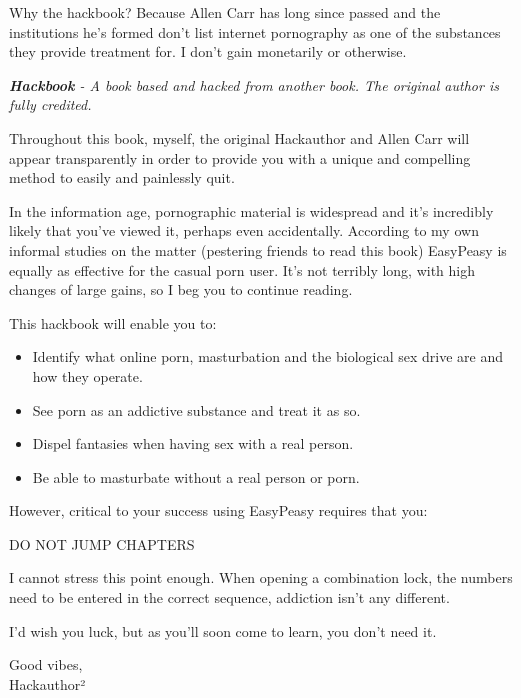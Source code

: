 \documentclass[easypeasy.tex]{subfiles}
\begin{document}
Why the hackbook? Because Allen Carr has long since passed and the institutions he's formed don't list internet pornography as one of the substances they provide treatment for. I don't gain monetarily or otherwise.

\textit{{\small \textbf{Hackbook} - A book based and hacked from another book. The original author is fully credited.}}

Throughout this book, myself, the original Hackauthor and Allen Carr will appear transparently in order to provide you with a unique and compelling method to easily and painlessly quit.

In the information age, pornographic material is widespread and it's incredibly likely that you've viewed it, perhaps even accidentally. According to my own informal studies on the matter (pestering friends to read this book) EasyPeasy is equally as effective for the casual porn user. It's not terribly long, with high changes of large gains, so I beg you to continue reading.

This hackbook will enable you to:
\begin{itemize}
  \item Identify what online porn, masturbation and the biological sex drive are and how they operate.
  \item See porn as an addictive substance and treat it as so.
  \item Dispel fantasies when having sex with a real person.
  \item Be able to masturbate without a real person or porn.
\end{itemize}

However, critical to your success using EasyPeasy requires that you:

{\huge DO NOT JUMP CHAPTERS}

I cannot stress this point enough. When opening a combination lock, the numbers need to be entered in the correct sequence, addiction isn't any different.

I'd wish you luck, but as you'll soon come to learn, you don't need it.

Good vibes, \\
Hackauthor²
\newpage
\tableofcontents
\end{document}
